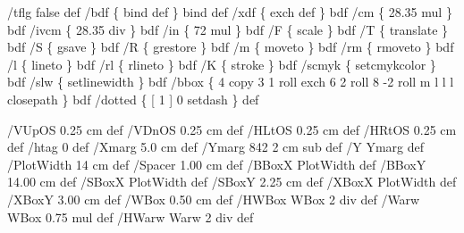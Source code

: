 \documentclass[11pt]{article}
\def\nwendcode{\endtrivlist \endgroup} %
\let\nwdocspar=\par                    %
\begin{document}


\nwenddocs{}\endmoddef
%
/tflg false def %
/bdf \{ bind def \} bind def
/xdf \{ exch def \} bdf
/cm \{ 28.35 mul \} bdf
/ivcm \{ 28.35 div \} bdf
/in \{ 72    mul \} bdf
/F \{ scale \} bdf
/T \{ translate \} bdf
/S \{ gsave \} bdf
/R \{ grestore \} bdf
/m \{ moveto \} bdf
/rm \{ rmoveto \} bdf
/l \{ lineto \} bdf
/rl \{ rlineto \} bdf
/K \{ stroke \} bdf
/scmyk \{ setcmykcolor \} bdf
/slw \{ setlinewidth \} bdf
/bbox \{ 4 copy 3 1 roll exch 6 2 roll 8 -2 roll m l l l closepath \} bdf
/dotted \{ [ 1 ] 0 setdash \} def
%
%
\nwendcode{}\nwdocspar


\nwenddocs{}\endmoddef
%
/VUpOS 0.25 cm def  %
/VDnOS 0.25 cm def  %
/HLtOS 0.25 cm def
/HRtOS 0.25 cm def
/htag   0 def
/Xmarg  5.0 cm def       %
/Ymarg  842 2 cm sub def
/Y Ymarg def
/PlotWidth  14 cm def    %
/Spacer   1.00 cm def    %
/BBoxX  PlotWidth def    %
/BBoxY   14.00 cm def    %
/SBoxX  PlotWidth def
/SBoxY    2.25 cm def
/XBoxX  PlotWidth def
/XBoxY    3.00 cm def
/WBox     0.50 cm def    %
/HWBox WBox 2 div    def
/Warw  WBox 0.75 mul def
/HWarw Warw 2 div    def
%
%
\nwendcode{}\nwdocspar

\end{document}
